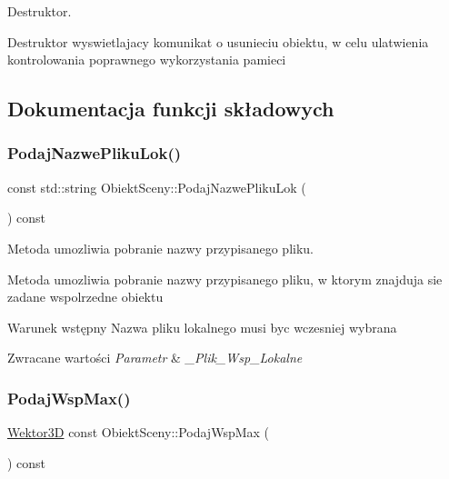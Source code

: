 Destruktor. 

Destruktor wyswietlajacy komunikat o usunieciu obiektu, w celu ulatwienia kontrolowania poprawnego wykorzystania pamieci 

\subsection{Dokumentacja funkcji składowych}
\mbox{\label{classObiektSceny_abe634a96ea225f2e21b3dead5207d122}} 
\subsubsection{\texorpdfstring{Podaj\+Nazwe\+Pliku\+Lok()}{PodajNazwePlikuLok()}}
{\footnotesize\ttfamily const std\+::string Obiekt\+Sceny\+::\+Podaj\+Nazwe\+Pliku\+Lok (\begin{DoxyParamCaption}{ }\end{DoxyParamCaption}) const\hspace{0.3cm}{\ttfamily [inline]}}



Metoda umozliwia pobranie nazwy przypisanego pliku. 

Metoda umozliwia pobranie nazwy przypisanego pliku, w ktorym znajduja sie zadane wspolrzedne obiektu \begin{DoxyPrecond}{Warunek wstępny}
Nazwa pliku lokalnego musi byc wczesniej wybrana 
\end{DoxyPrecond}

\begin{DoxyRetVals}{Zwracane wartości}
{\em Parametr} & {\itshape \+\_\+\+Plik\+\_\+\+Wsp\+\_\+\+Lokalne} \\
\hline
\end{DoxyRetVals}
\mbox{\label{classObiektSceny_ae6e0207ad7d44742b2973e92382619bb}} 
\subsubsection{\texorpdfstring{Podaj\+Wsp\+Max()}{PodajWspMax()}\hspace{0.1cm}{\footnotesize\ttfamily [1/2]}}
{\footnotesize\ttfamily \hyperlink{classSWektor}{Wektor3D} const Obiekt\+Sceny\+::\+Podaj\+Wsp\+Max (\begin{DoxyParamCaption}{ }\end{DoxyParamCaption}) const\hspace{0.3cm}{\ttfamily [inline]}}



